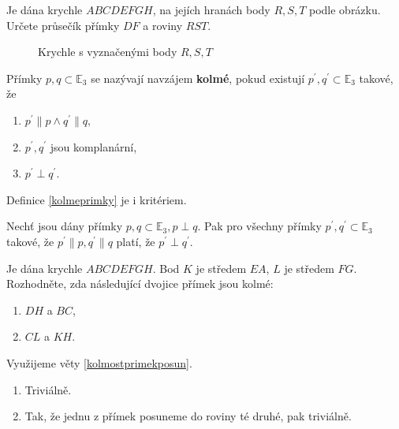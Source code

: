 \begin{priklad}
Je dána krychle $ABCDEFGH$, na jejích hranách body $R,S,T$ podle obrázku. Určete
průsečík přímky $DF$ a roviny $RST$.

\begin{figure}[ht!]
  \centering
  \caption{Krychle s vyznačenými body $R, S, T$}
\end{figure}
\end{priklad}

\begin{definition}\label{kolmeprimky}
    Přímky $p,q \subset \mathbb E_3$ se nazývají navzájem \textbf{kolmé}, pokud
    existují $p^\prime, q^\prime \subset \mathbb E_3$ takové, že
    \begin{enumerate}[$i.$]
    \item   $p^\prime \parallel p \land q^\prime \parallel q,$
   	\item $p^\prime, q^\prime$ jsou komplanární,
   	\item $p^\prime \perp q^\prime.$
    \end{enumerate}
\end{definition}

\begin{pozn}
    Definice \ref{kolmeprimky} je i kritériem.
\end{pozn}

\begin{veta}\label{kolmostprimekposun}
    Nechť jsou dány přímky $p,q \subset \mathbb E_3, p\perp q.$ Pak pro všechny přímky $p^\prime, q^\prime
    \subset \mathbb E_3$ takové, že $p^\prime \parallel p, q^\prime \parallel q$ platí, že $p^\prime \perp q^\prime.$
\end{veta}

\begin{priklad}
Je dána krychle $ABCDEFGH$. Bod $K$ je středem $EA$, $L$ je středem $FG$. Rozhodněte,
zda následující dvojice přímek jsou kolmé:
\begin{enumerate}[$a.$]
\item $DH$ a $BC$,
\item $CL$ a $KH$.
\end{enumerate}
\end{priklad}

\begin{reseni}
Využijeme věty \ref{kolmostprimekposun}.
\begin{enumerate}[$a.$]
\item Triviálně.
\item Tak, že jednu z přímek posuneme do roviny té druhé, pak triviálně.
\end{enumerate}
\end{reseni}

